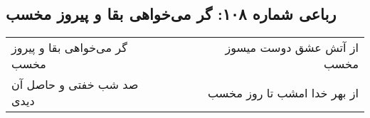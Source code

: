 \begin{center}
\section*{رباعی شماره ۱۰۸: گر می‌خواهی بقا و پیروز مخسب}
\label{sec:0108}
\begin{longtable}{l p{0.5cm} r}
گر می‌خواهی بقا و پیروز مخسب
&&
از آتش عشق دوست میسوز مخسب
\\
صد شب خفتی و حاصل آن دیدی
&&
از بهر خدا امشب تا روز مخسب
\\
\end{longtable}
\end{center}
